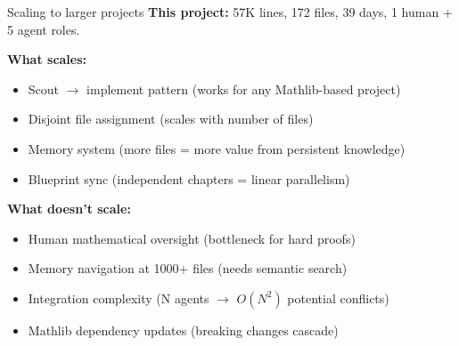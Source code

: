 \documentclass[aspectratio=169,10pt]{beamer}
\begin{document}
\begin{frame}{Scaling to larger projects}
    \textcolor{leangreen}{\textbf{This project:}} 57K lines, 172 files, 39 days, 1 human + 5 agent roles.
    \vspace{0.3em}

    \textcolor{amber}{\textbf{What scales:}}
    \begin{itemize}
        \item Scout $\to$ implement pattern {\scriptsize(works for any Mathlib-based project)}
        \item Disjoint file assignment {\scriptsize(scales with number of files)}
        \item Memory system {\scriptsize(more files = more value from persistent knowledge)}
        \item Blueprint sync {\scriptsize(independent chapters = linear parallelism)}
    \end{itemize}
    \vspace{0.3em}

    \textcolor{softred}{\textbf{What doesn't scale:}}
    \begin{itemize}
        \item Human mathematical oversight {\scriptsize(bottleneck for hard proofs)}
        \item Memory navigation at 1000+ files {\scriptsize(needs semantic search)}
        \item Integration complexity {\scriptsize(N agents $\to$ $O(N^2)$ potential conflicts)}
        \item Mathlib dependency updates {\scriptsize(breaking changes cascade)}
    \end{itemize}
\end{frame}
\end{document}
